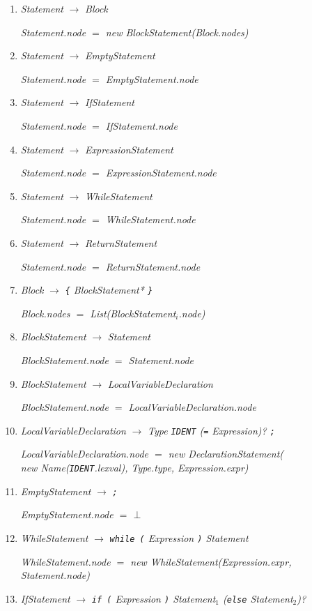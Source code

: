 \documentclass[12pt,a4paper]{scrartcl}
\renewcommand{\prod}[2]{\textit{#1} $\rightarrow$ \textit{#2}}
\newcommand{\tok}[1]{\textnormal{\texttt{#1}}}
\newcommand{\assign}[2]{\textit{#1} $=$ #2}
\newcommand{\List}[1]{\textnormal{List(\textit{#1})}}
\newcommand{\new}[2]{\textnormal{new #1(\textit{#2})}}
\newcommand{\attr}[1]{\parbox{\linewidth}{\raggedleft \textit{#1}}}
\begin{document}
\begin{enumerate}
    \item \prod{Statement}{Block}\\
        \attr{\assign{Statement.node}{\new{BlockStatement}{Block.nodes}}}
    \item \prod{Statement}{EmptyStatement}\\
        \attr{\assign{Statement.node}{EmptyStatement.node}}
    \item \prod{Statement}{IfStatement}\\
        \attr{\assign{Statement.node}{IfStatement.node}}
    \item \prod{Statement}{ExpressionStatement}\\
        \attr{\assign{Statement.node}{ExpressionStatement.node}}
    \item \prod{Statement}{WhileStatement}\\
        \attr{\assign{Statement.node}{WhileStatement.node}}
    \item \prod{Statement}{ReturnStatement}\\
        \attr{\assign{Statement.node}{ReturnStatement.node}}
    \item \prod{Block}{\tok{\{} BlockStatement* \tok{\}}}\\
        \attr{\assign{Block.nodes}{\List{BlockStatement$_i$.node}}}
    \item \prod{BlockStatement}{Statement}\\
        \attr{\assign{BlockStatement.node}{Statement.node}}
    \item \prod{BlockStatement}{LocalVariableDeclaration}\\
        \attr{\assign{BlockStatement.node}{LocalVariableDeclaration.node}}
    \item \prod{LocalVariableDeclaration}{Type \tok{IDENT} (\tok{=} Expression)? \tok{;}}\\
        \attr{\assign{LocalVariableDeclaration.node}{\new{DeclarationStatement}{\\\new{Name}{\tok{IDENT}.lexval}, Type.type, Expression.expr}}}
    \item \prod{EmptyStatement}{\tok{;}}\\
        \attr{\assign{EmptyStatement.node}{$\bot$}}
    \item \prod{WhileStatement}{\tok{while (} Expression \tok{)} Statement}\\
        \attr{\assign{WhileStatement.node}{\new{WhileStatement}{Expression.expr, Statement.node}}}
    \item \prod{IfStatement}{\tok{if (} Expression \tok{)} Statement$_1$ (\tok{else} Statement$_2$)?}\\

\end{enumerate}
\end{document}
